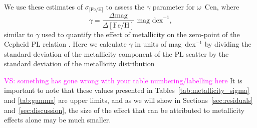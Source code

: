 \documentclass[a4paper,fleqn,usenatbib]{mnras}
\newcommand{\ocen}{$\omega$~Cen\xspace}
\providecommand{\vscomment}[1]{{\textcolor{magenta}{{VS: #1}}}\xspace}
\begin{document}
We use these estimates of $\sigma_\text{[Fe/H]}$ to assess the $\gamma$ parameter for \ocen, where 
\begin{equation} \label{eqn:gamma}
\gamma = \dfrac {\Delta \text{mag}} {\Delta [\text{Fe/H}]}\text{ mag dex} ^{-1}\text{,}
\end{equation}
similar to $\gamma$ used to quantify the effect of metallicity on the zero-point of the Cepheid PL relation \citep{1998ApJ...498..181K, 2009MNRAS.396.1287S}. Here we calculate $\gamma$ in units of mag~dex$^{-1}$ by dividing the standard deviation of the metallicity component of the PL scatter by the standard deviation of the metallicity distribution %

\vscomment{something has gone wrong with your table numbering/labelling here}
It is important to note that these values presented in Tables~\ref{tab:metallicity_sigma} and \ref{tab:gamma} are upper limits, and as we will show in Sections~\ref{sec:residuals} and~\ref{sec:discussion}, the size of the effect that can be attributed to metallicity effects alone may be much smaller. 



\end{document}
